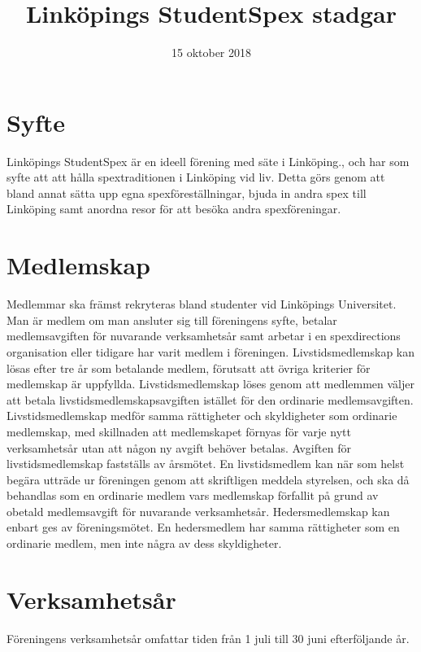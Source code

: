 \documentclass[a4paper]{article}
\title{Linköpings StudentSpex stadgar}
\author{}
\date{15 oktober 2018}
\begin{document}
\maketitle

\section{Syfte}
Linköpings StudentSpex är en ideell förening med säte i Linköping., och har som syfte att att hålla spextraditionen i Linköping vid liv. Detta görs genom att bland annat sätta upp egna spexföreställningar, bjuda in andra spex till Linköping samt anordna resor för att besöka andra spexföreningar.

\section{Medlemskap}
Medlemmar ska främst rekryteras bland studenter vid Linköpings Universitet. Man är medlem om man ansluter sig till föreningens syfte, betalar medlemsavgiften för nuvarande verksamhetsår samt arbetar i en spexdirections organisation eller tidigare har varit medlem i föreningen.\newline
\newline
Livstidsmedlemskap kan lösas efter tre år som betalande medlem, förutsatt att övriga kriterier för medlemskap är uppfyllda. Livstidsmedlemskap löses genom att medlemmen väljer att betala livstidsmedlemskapsavgiften istället för den ordinarie medlemsavgiften. Livstidsmedlemskap medför samma rättigheter och skyldigheter som ordinarie medlemskap, med skillnaden att medlemskapet förnyas för varje nytt verksamhetsår utan att någon ny avgift behöver betalas. Avgiften för livstidsmedlemskap fastställs av årsmötet. En livstidsmedlem kan när som helst begära utträde ur föreningen genom att skriftligen meddela styrelsen, och ska då behandlas som en ordinarie medlem vars medlemskap förfallit på grund av obetald medlemsavgift för nuvarande verksamhetsår.\newline
\newline
Hedersmedlemskap kan enbart ges av föreningsmötet. En hedersmedlem har samma rättigheter som en ordinarie medlem, men inte några av dess skyldigheter.

\section{Verksamhetsår}

Föreningens verksamhetsår omfattar tiden från 1 juli till 30 juni efterföljande år.
\end{document}

